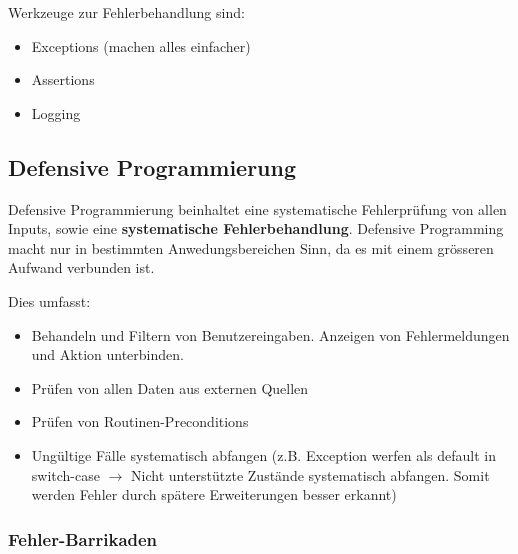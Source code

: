 Werkzeuge zur Fehlerbehandlung sind:

\begin{itemize}
	\item Exceptions (machen alles einfacher)
	\item Assertions
	\item Logging
\end{itemize}

\subsection{Defensive Programmierung}

Defensive Programmierung beinhaltet eine systematische Fehlerprüfung von allen Inputs, sowie eine \textbf{systematische Fehlerbehandlung}. Defensive Programming macht nur in bestimmten Anwedungsbereichen Sinn, da es mit einem grösseren Aufwand verbunden ist.

Dies umfasst:
\begin{itemize}
	\item Behandeln und Filtern von Benutzereingaben. Anzeigen von Fehlermeldungen und Aktion unterbinden.
	\item Prüfen von allen Daten aus externen Quellen
	\item Prüfen von Routinen-Preconditions
	\item Ungültige Fälle systematisch abfangen (z.B. Exception werfen als default in switch-case $\rightarrow$ Nicht unterstützte Zustände systematisch abfangen. Somit werden Fehler durch spätere Erweiterungen besser erkannt)
\end{itemize}
	
\subsubsection{Fehler-Barrikaden}


